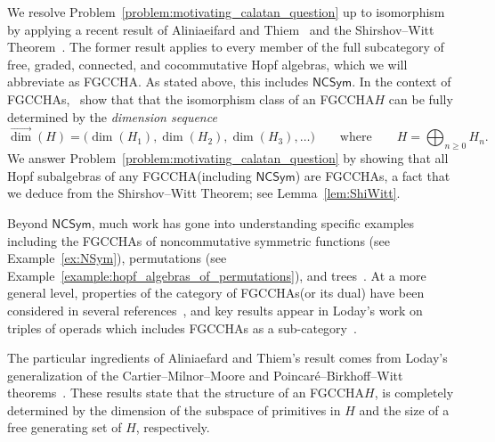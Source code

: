 \documentclass[11pt]{amsart}
\theoremstyle{definition}
\newtheorem{problem}[theorem]{Problem}
\numberwithin{equation}{section}
\newcommand{\FGCCHA}{\textsf{FGCCHA}\xspace}
\newcommand{\FGCCHAs}{\textsf{FGCCHA}s\xspace}
\newcommand{\vecdim}{\overrightarrow{\dim}}
\newcommand{\NCSym}{\mathsf{NCSym}}
\begin{document}
%   

We resolve Problem~\ref{problem:motivating_calatan_question} up to isomorphism by applying a recent result of Aliniaeifard and Thiem~\cite{AT22} and the Shirshov--Witt Theorem~\cite{S09, Witt56}.  
The former result applies to every member of the full subcategory of free, graded, connected, and cocommutative Hopf algebras, which we will abbreviate as \FGCCHA.  
As stated above, this includes $\NCSym$.  
In the context of \FGCCHAs,~\cite[Theorem~4.2]{AT22} show that that the isomorphism class of an
\FGCCHA $H$ can be fully determined by the \emph{dimension sequence}
\[
\vecdim(H) = \big( \dim(H_{1}), \dim(H_{2}), \dim(H_{3}), \ldots \big)
\qquad\text{where}\qquad
H = \bigoplus_{n \ge 0} H_{n}.
\]
We answer Problem~\ref{problem:motivating_calatan_question} by showing that all Hopf subalgebras of any \FGCCHA (including $\NCSym$) are \FGCCHAs, a fact that we deduce from the Shirshov--Witt Theorem; see Lemma~\ref{lem:ShiWitt}.  


Beyond $\NCSym$, much work has gone into understanding specific examples including the \FGCCHAs of noncommutative symmetric functions (see Example~\ref{ex:NSym}), permutations (see Example~\ref{example:hopf_algebras_of_permutations}), and trees~\cite{AS05cc, GL09}.  
At a more general level, properties of the category of \FGCCHAs (or its dual) have been considered in several references~\cite{AT22, Block85, FP24, LodayRonco10, MM65, Reutenauer-FreeLieAlgebras}, and key results appear in Loday's work on triples of operads which includes \FGCCHAs as a sub-category~\cite[Section 4.1]{L08}.  

The particular ingredients of Aliniaefard and Thiem's result comes from Loday's generalization of the  Cartier--Milnor--Moore and Poincar\'{e}--Birkhoff--Witt theorems~\cite[Theorem 4.1.3]{L08}.  These results state that the structure of an \FGCCHA $H$, is completely determined by the dimension of the subspace of primitives in $H$ and the size of a free generating set of $H$, respectively.
\end{document}
